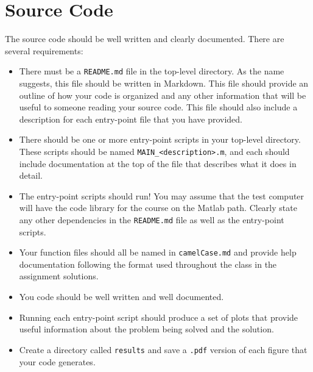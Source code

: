 \section*{Source Code}

The source code should be well written and clearly documented.
There are several requirements:

\vspace{-0.0em} \begin{itemize}  \setlength\itemsep{0em} \setlength\itemindent{4pt}

  \item There must be a \texttt{README.md} file in the top-level directory.
        As the name suggests, this file should be written in Markdown.
        This file should provide an outline of how your code is organized
        and any other information that will be useful to someone reading
        your source code. This file should also include a description
        for each entry-point file that you have provided.

  \item There should be one or more entry-point scripts in your top-level
        directory. These scripts should be named \texttt{MAIN\_<description>.m},
        and each should include documentation at the top of the file that
        describes what it does in detail.

  \item The entry-point scripts should run! You may assume that the test
        computer will have the code library for the course on the Matlab path.
        Clearly state any other dependencies in the \texttt{README.md} file
        as well as the entry-point scripts.

  \item Your function files should all be named in \texttt{camelCase.md} and
        provide help documentation following the format used throughout the
        class in the assignment solutions.

  \item You code should be well written and well documented.

  \item Running each entry-point script should produce a set of plots that
        provide useful information about the problem being solved and the solution.

  \item Create a directory called \texttt{results} and save a \texttt{.pdf} version
        of each figure that your code generates.

\end{itemize}

